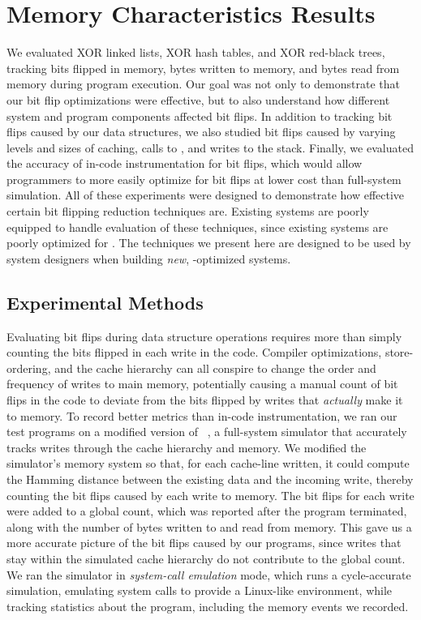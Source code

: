 \section{Memory Characteristics Results}
\label{sec:evaluation}

We evaluated XOR linked lists, XOR hash tables, and XOR red-black trees,
tracking bits flipped in memory, bytes written to memory, and bytes read from
memory during program execution. Our goal was not only to demonstrate that our
bit flip optimizations were effective, but to also understand how different
system and program components affected bit flips. In addition to tracking bit
flips caused by our data structures, we also studied bit flips caused by varying
levels and sizes of caching, calls to \malloc, and writes to the stack. Finally, we evaluated the
accuracy of in-code instrumentation for bit flips, which would allow programmers
to more easily optimize for bit flips at lower cost than full-system simulation.
All of these experiments were designed to demonstrate how effective certain bit flipping reduction
techniques are. Existing systems are poorly equipped to handle evaluation of these techniques, since
existing systems are poorly optimized for \NVM. The techniques we present here are designed to be
used by system designers when building \emph{new}, \NVM-optimized systems.

\subsection{Experimental Methods}


Evaluating bit flips during data structure operations requires more than simply
counting the bits flipped in each write in the code. Compiler optimizations,
store-ordering, and the cache hierarchy can all conspire to change the order and
frequency of writes to main memory, potentially causing a manual count of bit
flips in the code to deviate from the bits flipped by writes that
\textit{actually} make it to memory. To record better metrics than in-code
instrumentation, we ran our test programs on a modified version of \gem~\cite{gem5}, a full-system
simulator that accurately tracks writes through the cache hierarchy and
memory. We modified the simulator's memory system so that, for each
cache-line written, it could compute the Hamming distance between the existing
data and the incoming write, thereby counting the bit flips caused by each
write to memory. The bit flips for each write were added to a global count,
which was reported after the program terminated, along with the number of bytes
written to and read from memory. This gave us a more accurate picture of the bit
flips caused by our programs, since writes that stay within the simulated cache
hierarchy do not contribute to the global count.
We ran the simulator in
\textit{system-call emulation} mode, which runs a cycle-accurate simulation,
emulating system calls to provide a Linux-like environment, while
tracking statistics about the program, including the memory events we recorded.



